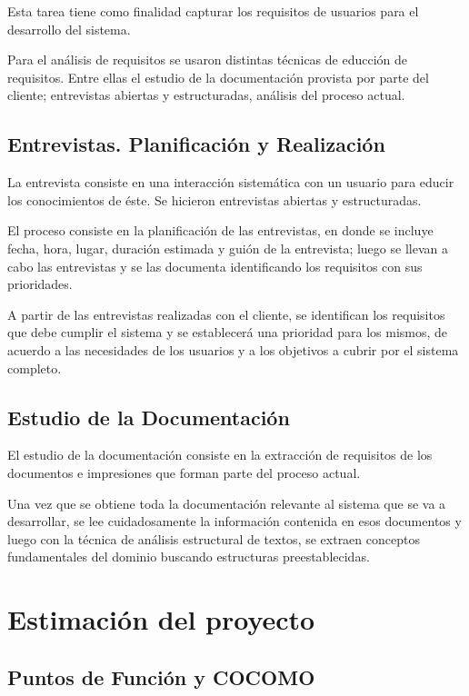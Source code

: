   Esta tarea tiene como finalidad capturar los requisitos de usuarios para el desarrollo del sistema.

Para el análisis de requisitos se usaron distintas técnicas de educción de requisitos. Entre ellas el estudio de la documentación provista por parte del cliente; entrevistas abiertas y estructuradas, análisis del proceso actual.
  
  \subsection{Entrevistas. Planificación y Realización}
  
  La entrevista consiste en una interacción sistemática con un usuario para educir los conocimientos de éste. Se hicieron entrevistas abiertas y estructuradas. 

El proceso consiste en la  planificación de las entrevistas, en donde se incluye fecha, hora, lugar, duración estimada y guión de la entrevista; luego se llevan a cabo las entrevistas y se las documenta identificando los requisitos con sus prioridades.  

A partir de las entrevistas realizadas con el cliente, se identifican los requisitos que debe cumplir el sistema y se establecerá una prioridad para los mismos, de acuerdo a las necesidades de los usuarios y a los objetivos a cubrir por el sistema completo.

  \subsection{Estudio de la Documentación}
  
El estudio de la documentación consiste en la extracción de requisitos de los documentos e impresiones que forman parte del proceso actual.

Una vez que se obtiene toda la documentación relevante al sistema que se va a desarrollar, se lee cuidadosamente la información contenida en esos documentos y luego con la técnica de análisis estructural de textos, se extraen conceptos fundamentales del dominio buscando estructuras preestablecidas.

\section{Estimación del proyecto}

 \subsection{Puntos de Función y COCOMO}
 
